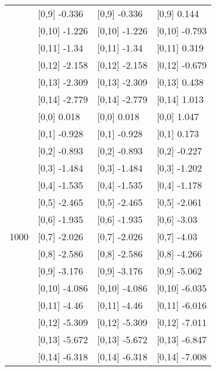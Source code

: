 \begin{table}
\begin{tabular}[t]{llll}
 & {}[0,9] -0.336 & {}[0,9] -0.336 & {}[0,9] 0.144\\
\addlinespace
 & {}[0,10] -1.226 & {}[0,10] -1.226 & {}[0,10] -0.793\\
 & {}[0,11] -1.34 & {}[0,11] -1.34 & {}[0,11] 0.319\\
 & {}[0,12] -2.158 & {}[0,12] -2.158 & {}[0,12] -0.679\\
 & {}[0,13] -2.309 & {}[0,13] -2.309 & {}[0,13] 0.438\\
 & {}[0,14] -2.779 & {}[0,14] -2.779 & {}[0,14] 1.013\\
\addlinespace
 & {}[0,0] 0.018 & {}[0,0] 0.018 & {}[0,0] 1.047\\
 & {}[0,1] -0.928 & {}[0,1] -0.928 & {}[0,1] 0.173\\
 & {}[0,2] -0.893 & {}[0,2] -0.893 & {}[0,2] -0.227\\
 & {}[0,3] -1.484 & {}[0,3] -1.484 & {}[0,3] -1.202\\
 & {}[0,4] -1.535 & {}[0,4] -1.535 & {}[0,4] -1.178\\
\addlinespace
 & {}[0,5] -2.465 & {}[0,5] -2.465 & {}[0,5] -2.061\\
 & {}[0,6] -1.935 & {}[0,6] -1.935 & {}[0,6] -3.03\\
1000 & {}[0,7] -2.026 & {}[0,7] -2.026 & {}[0,7] -4.03\\
 & {}[0,8] -2.586 & {}[0,8] -2.586 & {}[0,8] -4.266\\
 & {}[0,9] -3.176 & {}[0,9] -3.176 & {}[0,9] -5.062\\
\addlinespace
 & {}[0,10] -4.086 & {}[0,10] -4.086 & {}[0,10] -6.035\\
 & {}[0,11] -4.46 & {}[0,11] -4.46 & {}[0,11] -6.016\\
 & {}[0,12] -5.309 & {}[0,12] -5.309 & {}[0,12] -7.011\\
 & {}[0,13] -5.672 & {}[0,13] -5.672 & {}[0,13] -6.847\\
 & {}[0,14] -6.318 & {}[0,14] -6.318 & {}[0,14] -7.008\\
\bottomrule
\end{tabular}
\end{table}
